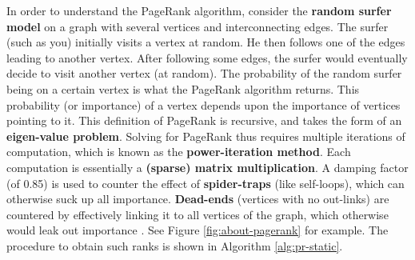 In order to understand the PageRank algorithm, consider the \textbf{random surfer model} on a graph with several vertices and interconnecting edges. The surfer (such as you) initially visits a vertex at random. He then follows one of the edges leading to another vertex. After following some edges, the surfer would eventually decide to visit another vertex (at random). The probability of the random surfer being on a certain vertex is what the PageRank algorithm returns. This probability (or importance) of a vertex depends upon the importance of vertices pointing to it. This definition of PageRank is recursive, and takes the form of an \textbf{eigen-value problem}. Solving for PageRank thus requires multiple iterations of computation, which is known as the \textbf{power-iteration method}. Each computation is essentially a \textbf{(sparse) matrix multiplication}. A damping factor (of 0.85) is used to counter the effect of \textbf{spider-traps} (like self-loops), which can otherwise suck up all importance. \textbf{Dead-ends} (vertices with no out-links) are countered by effectively linking it to all vertices of the graph, which otherwise would leak out importance \cite{pr-leskovec19}. See Figure \ref{fig:about-pagerank} for example. The procedure to obtain such ranks is shown in Algorithm \ref{alg:pr-static}.

